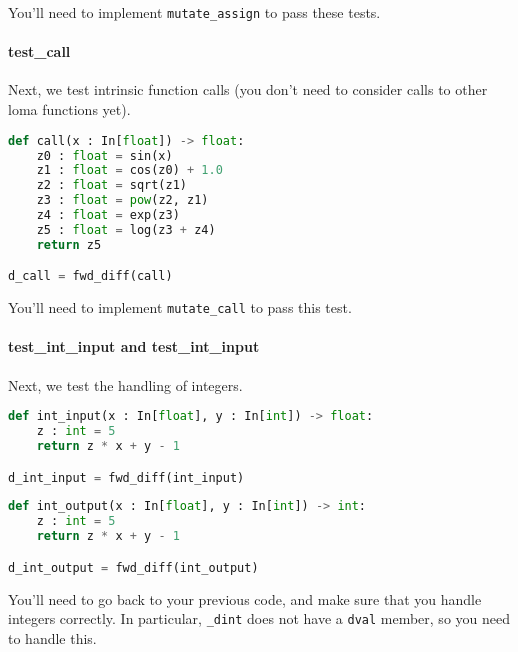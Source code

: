 You'll need to implement \lstinline{mutate_assign} to pass these tests.

\paragraph{test_call} Next, we test intrinsic function calls (you don't need to consider calls to other loma functions yet).
\begin{lstlisting}[language=Python]
def call(x : In[float]) -> float:
    z0 : float = sin(x)
    z1 : float = cos(z0) + 1.0
    z2 : float = sqrt(z1)
    z3 : float = pow(z2, z1)
    z4 : float = exp(z3)
    z5 : float = log(z3 + z4)
    return z5

d_call = fwd_diff(call)
\end{lstlisting}
You'll need to implement \lstinline{mutate_call} to pass this test.

\paragraph{test_int_input and test_int_input} Next, we test the handling of integers.
\begin{lstlisting}[language=Python]
def int_input(x : In[float], y : In[int]) -> float:
    z : int = 5
    return z * x + y - 1

d_int_input = fwd_diff(int_input)
\end{lstlisting}
\begin{lstlisting}[language=Python]
def int_output(x : In[float], y : In[int]) -> int:
    z : int = 5
    return z * x + y - 1

d_int_output = fwd_diff(int_output)
\end{lstlisting}
You'll need to go back to your previous code, and make sure that you handle integers correctly. In particular, \lstinline{_dint} does not have a \lstinline{dval} member, so you need to handle this.

